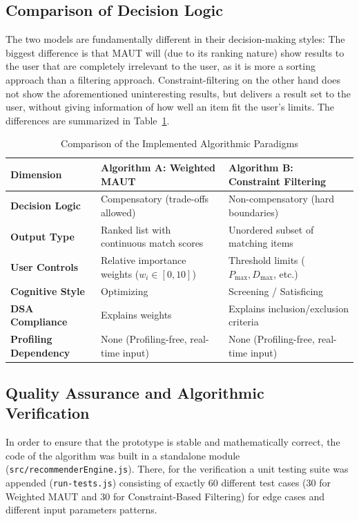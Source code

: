 \documentclass[acmlarge]{acmart}
\begin{document}
\subsection{Comparison of Decision Logic}
The two models are fundamentally different in their decision-making styles: The biggest difference is that MAUT will (due to its ranking nature) show results to the user that are completely irrelevant to the user, as it is more a sorting approach than a filtering approach. Constraint-filtering on the other hand does not show the aforementioned uninteresting results, but delivers a result set to the user, without giving information of how well an item fit the user's limits. The differences are summarized in Table~\ref{tab:comparison}.

\begin{table}[h]
  \caption{Comparison of the Implemented Algorithmic Paradigms}
  \label{tab:comparison}
  \begin{tabular}{lll}
    \toprule
    Dimension & Algorithm A: Weighted MAUT & Algorithm B: Constraint Filtering \\
    \midrule
    \textbf{Decision Logic} & Compensatory (trade-offs allowed) & Non-compensatory (hard boundaries) \\
    \textbf{Output Type} & Ranked list with continuous match scores & Unordered subset of matching items \\
    \textbf{User Controls} & Relative importance weights ($w_i \in [0, 10]$) & Threshold limits ($P_{\text{max}}, D_{\text{max}}$, etc.) \\
    \textbf{Cognitive Style} & Optimizing & Screening / Satisficing \\
    \textbf{DSA Compliance} & Explains weights & Explains inclusion/exclusion criteria \\
    \textbf{Profiling Dependency} & None (Profiling-free, real-time input) & None (Profiling-free, real-time input) \\
    \bottomrule
  \end{tabular}
\end{table}

\subsection{Quality Assurance and Algorithmic Verification}
In order to ensure that the prototype is stable and mathematically correct, the code of the algorithm was built in a standalone module (\texttt{src/recommenderEngine.js}). There, for the verification a unit testing suite was appended (\texttt{run-tests.js}) consisting of exactly 60 different test cases (30 for Weighted MAUT and 30 for Constraint-Based Filtering) for edge cases and different input parameters patterns.
\end{document}
